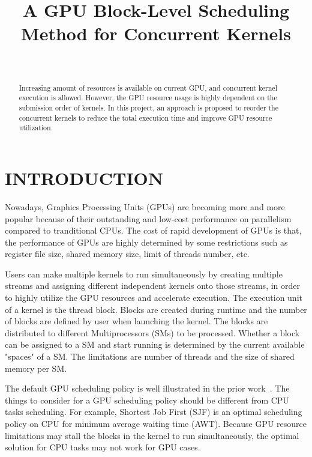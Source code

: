 \documentclass[12pt,journal,compsoc]{IEEEtran}
\begin{document}
\title{\LARGE \bf A GPU Block-Level Scheduling Method for Concurrent Kernels}

\author{ \\
}

\maketitle

\begin{abstract}
Increasing amount of resources is available on current GPU, and concurrent kernel execution is allowed. However, the GPU resource usage is highly dependent on the submission order of kernels. In this project, an approach is proposed to reorder the concurrent kernels to reduce the total execution time and improve GPU resource utilization. 
\end{abstract}


\section{INTRODUCTION}
Nowadays, Graphics Processing Units (GPUs) are becoming more and more popular because of their outstanding and low-cost performance on parallelism compared to tranditional CPUs. The cost of rapid development of GPUs is that, the performance of GPUs are highly determined by some restrictions such as register file size, shared memory size, limit of threads number, etc. 

Users can make multiple kernels to run simultaneously by creating multiple streams and assigning different independent kernels onto those streams, in order to highly utilize the GPU resources and accelerate execution. The execution unit of a kernel is the thread block. Blocks are created during runtime and the number of blocks are defined by user when launching the kernel. The blocks are distributed to different Multiprocessors (SMs) to be processed. Whether a block can be assigned to a SM and start running is determined by the current available "spaces" of a SM. The limitations are number of threads and the size of shared memory per SM.

The default GPU scheduling policy is well illustrated in the prior work~\cite{c1}. The things to consider for a GPU scheduling policy should be different from CPU tasks scheduling. For example, Shortest Job First (SJF) is an optimal scheduling policy on CPU for minimum average waiting time (AWT). Because GPU resource limitations may stall the blocks in the kernel to run simultaneously, the optimal solution for CPU tasks may not work for GPU cases.
\end{document}
